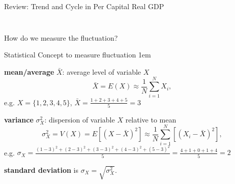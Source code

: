 \documentclass[11pt,aspectratio=43]{beamer}
\let\olditemize=\itemize
\let\endolditemize=\enditemize
\renewenvironment{itemize}{\olditemize \itemsep1em}{\endolditemize}
\theoremstyle{definition}
\begin{document}
\begin{frame}{Review: Trend and Cycle in Per Capital Real GDP}
\begin{columns}
\begin{column}{0.5\textwidth}
\begin{figure}
        \end{figure}
    \end{column}
\end{columns}
\begin{center}
    How do we measure the fluctuation?
\end{center}
\end{frame}

\begin{frame}{Statistical Concept to measure fluctuation}
\label{slide:Statistical_Concept}
    \begin{itemize}
        \item \textbf{mean/average} $ \bar{X} $: average level of variable $ X $
        \begin{equation}
        \label{eq:average}
            \bar{X} = E( X ) \approx \frac{1}{N} \sum_{i=1}^{N} X_{i}
        ,\end{equation}
        e.g. $ X = \{ 1, 2, 3, 4, 5 \} $, $ \bar{X} = \frac{1+2+3+4+5}{5} = 3 $
        \item \textbf{variance} $ \sigma_{X}^{2} $: dispersion of variable $ X $ relative to mean
        \begin{equation}
        \label{eq:variance}
            \sigma_{X}^{2} = V( X ) = E[ ( X - \bar{X} )^{2} ] \approx \frac{1}{N} \sum_{i=1}^{N} [ ( X_{i} - \bar{X} )^{2} ]
        ,\end{equation}
        e.g. $ \sigma_{X} = \frac{( 1-3 )^{2} + ( 2-3 )^{2} + ( 3-3 )^{2} + ( 4-3 )^{2} + ( 5-3 )^{2}}{5} = \frac{4 + 1 + 0 + 1 + 4}{5} = 2  $

        \textbf{standard deviation} is $ \sigma_{X} = \sqrt{\sigma_{X}^{2}} $.

    \end{itemize}
\end{frame}
\end{document}
